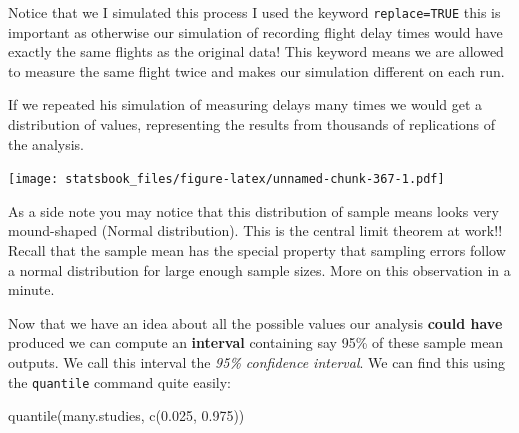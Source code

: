 \documentclass[
]{book}
\newenvironment{Shaded}{\begin{snugshade}}{\end{snugshade}}
\newcommand{\AttributeTok}[1]{\textcolor[rgb]{0.77,0.63,0.00}{#1}}
\newcommand{\ConstantTok}[1]{\textcolor[rgb]{0.00,0.00,0.00}{#1}}
\newcommand{\DecValTok}[1]{\textcolor[rgb]{0.00,0.00,0.81}{#1}}
\newcommand{\DocumentationTok}[1]{\textcolor[rgb]{0.56,0.35,0.01}{\textbf{\textit{#1}}}}
\newcommand{\FloatTok}[1]{\textcolor[rgb]{0.00,0.00,0.81}{#1}}
\newcommand{\FunctionTok}[1]{\textcolor[rgb]{0.00,0.00,0.00}{#1}}
\newcommand{\NormalTok}[1]{#1}
\newcommand{\OtherTok}[1]{\textcolor[rgb]{0.56,0.35,0.01}{#1}}
\newcommand{\SpecialCharTok}[1]{\textcolor[rgb]{0.00,0.00,0.00}{#1}}
\newcommand{\StringTok}[1]{\textcolor[rgb]{0.31,0.60,0.02}{#1}}
\theoremstyle{definition}
\theoremstyle{definition}
\theoremstyle{definition}
\theoremstyle{definition}
\theoremstyle{remark}
\begin{document}
Notice that we I simulated this process I used the keyword \texttt{replace=TRUE} this is important as otherwise our simulation of recording flight delay times would have exactly the same flights as the original data! This keyword means we are allowed to measure the same flight twice and makes our simulation different on each run.

If we repeated his simulation of measuring delays many times we would get a distribution of values, representing the results from thousands of replications of the analysis.

\begin{Shaded}
\end{Shaded}

\texttt{[image: statsbook\_files/figure-latex/unnamed-chunk-367-1.pdf]}

As a side note you may notice that this distribution of sample means looks very mound-shaped (Normal distribution). This is the central limit theorem at work!! Recall that the sample mean has the special property that sampling errors follow a normal distribution for large enough sample sizes. More on this observation in a minute.

Now that we have an idea about all the possible values our analysis \textbf{could have} produced we can compute an \textbf{interval} containing say 95\% of these sample mean outputs. We call this interval the \emph{95\% confidence interval}. We can find this using the \texttt{quantile} command quite easily:

\begin{Shaded}
\begin{Highlighting}[]
\FunctionTok{quantile}\NormalTok{(many.studies, }\FunctionTok{c}\NormalTok{(}\FloatTok{0.025}\NormalTok{, }\FloatTok{0.975}\NormalTok{))}
\end{Highlighting}
\end{Shaded}
\end{document}
